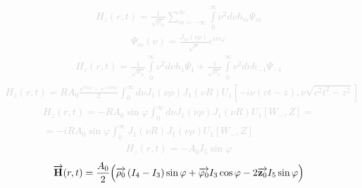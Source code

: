 %
\textcolor{lightgray} { \begin{equation*} \begin{aligned}
H_z (r,t) = \frac{1}{\sqrt{\mu_0}} \sum \limits_{m=-\infty}^{\infty}
\int \limits_0^\infty \nu^2 d \nu h_m \Psi_m
\end{aligned} \end{equation*} }
%
\textcolor{lightgray} { \begin{equation*} \begin{aligned}
\Psi_m (\nu) = \frac{J_m(\nu \rho)}{\sqrt{\nu}} e^{im \varphi} 
\end{aligned} \end{equation*} }
%
\textcolor{lightgray} { \begin{equation*} \begin{aligned}
H_z (r,t) = 
\frac{1}{\sqrt{\mu_0}} \int \limits_0^\infty \nu^2 d \nu h_{1} \Psi_{1} +
\frac{1}{\sqrt{\mu_0}} \int \limits_0^\infty \nu^2 d \nu h_{-1} \Psi_{-1}
\end{aligned} \end{equation*} }
%
\textcolor{lightgray} { \begin{equation*} \begin{aligned}
H_z (r,t) = R A_0 \frac{e^{im \varphi}-e^{-im \varphi}}{2} \int_0^\infty 
d \nu J_1(\nu \rho) J_1 (\nu R)
U_1 \left[ -i \nu (ct-z), \nu \sqrt{c^2t^2-z^2} \right]
\end{aligned} \end{equation*} }
%
\textcolor{lightgray} { \begin{equation*} \begin{aligned}
H_z (r,t) = - R A_0 \sin \varphi \int_0^\infty 
d \nu J_1(\nu \rho) J_1 (\nu R) U_1 [ W_-, Z ] = \\
= - i R A_0 \sin \varphi \int_{0}^{\infty} J_1 \left( \nu R \right)
J_1 \left( \nu \rho \right) U_1 [ W_-, Z ]
\end{aligned} \end{equation*} }
%
\textcolor{lightgray} { \begin{equation*} \begin{aligned}
H_z \left( r, t \right) = - A_0 I_5 \sin \varphi
\end{aligned} \end{equation*} }
%
\begin{equation} \label{eq:linear_h_cyl}
\overrightarrow{\mathbf H} (r, t) = \frac{A_0}{2} \Big( 
\overrightarrow{\mathbf \rho_0} \left( I_4 - I_3 \right) \sin \varphi +
\overrightarrow{\mathbf \varphi_0} I_3 \cos \varphi -
2 \overrightarrow{\mathbf z_0} I_5 \sin \varphi \Big)
\end{equation}
